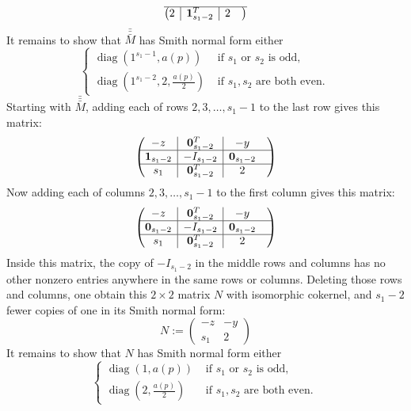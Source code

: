 \documentclass[10pt,reqno]{amsart}
\newcommand{\rvline}{\hspace*{-\arraycolsep}\vline\hspace*{-\arraycolsep}}
\DeclareMathOperator{\diag}{diag}
\def\onesvector{\mathbf{1}}
\def\zerovector{\mathbf{0}}
\begin{document}
\begin{enumerate}
\begin{equation*}
\begin{pmatrix}
\hline
2  & \rvline &  \onesvector^T_{s_1-2} & \rvline & 2   &
\end{pmatrix}
\end{equation*}
It remains to show that $\bar{\bar{\bar{M}}}$ has Smith normal form either 
$$
\begin{cases}
  \diag(1^{s_1-1},a(p)) & \text{ if }s_1\text{ or }s_2\text{ is odd},\\  
  \diag(1^{s_1-2},2,\frac{a(p)}{2}) & \text{ if }s_1,s_2\text{ are both even}.\
\end{cases}
$$
Starting with $\bar{\bar{\bar{M}}}$, adding each of rows $2,3,\ldots,s_1-1$ to the last row gives this matrix:
\begin{equation*}
\begin{pmatrix}
-z & \rvline & \zerovector^T_{s_1-2} & \rvline &-y  &\\
\hline
\onesvector_{s_1-2} & \rvline & -I_{s_1-2} &\rvline & \zerovector_{s_1-2} &\\
\hline
s_1  & \rvline &  \zerovector^T_{s_1-2} & \rvline & 2   &
\end{pmatrix}
\end{equation*}
Now adding each of columns $2,3,\ldots,s_1-1$ to the first column gives this matrix:
\begin{equation*}
\begin{pmatrix}
-z & \rvline & \zerovector^T_{s_1-2} & \rvline &-y  &\\
\hline
\zerovector_{s_1-2} & \rvline & -I_{s_1-2} &\rvline & \zerovector_{s_1-2} &\\
\hline
s_1  & \rvline &  \zerovector^T_{s_1-2} & \rvline & 2   &
\end{pmatrix}
\end{equation*}
Inside this matrix, the copy of 
$-I_{s_1-2}$ in the middle rows and columns has no other nonzero entries anywhere in the same rows or columns.  Deleting those rows and columns, one obtain this $2 \times 2$ matrix $N$ with isomorphic cokernel, and
$s_1-2$ fewer copies of one in its Smith normal form:
\begin{equation*}
N:=\begin{pmatrix}
-z & -y  \\
s_1  & 2   
\end{pmatrix}
\end{equation*}
It remains to show that $N$ has Smith normal form either 
$$
\begin{cases}
  \diag(1,a(p)) & \text{ if }s_1\text{ or }s_2\text{ is odd},\\  
  \diag(2,\frac{a(p)}{2}) & \text{ if }s_1,s_2\text{ are both even}.\
\end{cases}
$$


\end{enumerate}
\end{document}

